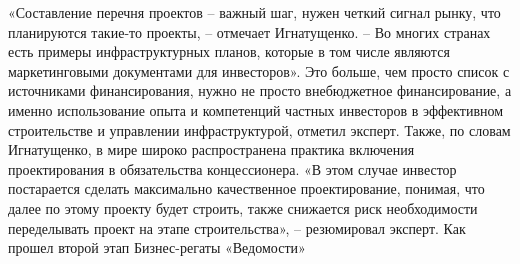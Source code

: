 «Составление перечня проектов – важный шаг, нужен четкий сигнал рынку, что планируются такие-то проекты, – отмечает Игнатущенко. – Во многих странах есть примеры инфраструктурных планов, которые в том числе являются маркетинговыми документами для инвесторов». Это больше, чем просто список с источниками финансирования, нужно не просто внебюджетное финансирование, а именно использование опыта и компетенций частных инвесторов в эффективном строительстве и управлении инфраструктурой, отметил эксперт. Также, по словам Игнатущенко, в мире широко распространена практика включения проектирования в обязательства концессионера. «В этом случае инвестор постарается сделать максимально качественное проектирование, понимая, что далее по этому проекту будет строить, также снижается риск необходимости переделывать проект на этапе строительства», – резюмировал эксперт.
Как прошел второй этап Бизнес-регаты «Ведомости»

